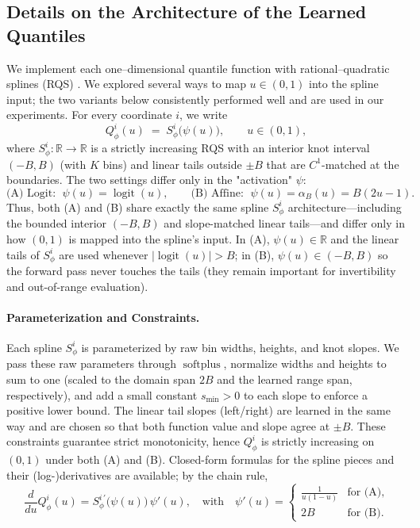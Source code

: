 \documentclass{article}
\theoremstyle{plain}
\theoremstyle{definition}
\theoremstyle{remark}
\begin{document}
\subsection{Details on the Architecture of the Learned Quantiles}\label{appendix:learned-quantile}
{We implement each one–dimensional quantile function with rational–quadratic splines (RQS) \cite{GD1982,durkan2019neural}. We explored several ways to map \(u\in(0,1)\) into the spline input; the two variants below consistently performed well and are used in our experiments. For every coordinate \(i\), we write
\[
Q^i_\phi(u) \;=\; S^i_\phi\!\bigl(\psi(u)\bigr), \qquad u\in(0,1),
\]
where \(S^i_\phi:\mathbb{R}\!\to\!\mathbb{R}\) is a strictly increasing RQS with an interior knot interval \((-B,B)\) (with \(K\) bins) and linear tails outside \(\pm B\) that are \(C^1\)-matched at the boundaries. The two settings differ only in the "activation" \(\psi\):
\[
\text{(A) Logit: }\;\psi(u)=\operatorname{logit}(u), 
\qquad 
\text{(B) Affine: }\;\psi(u)=\alpha_B(u)=B(2u-1).
\]
Thus, both (A) and (B) share exactly the same spline \(S^i_\phi\) architecture—including the bounded interior \((-B,B)\) and slope-matched linear tails—and differ only in how \((0,1)\) is mapped into the spline's input. In (A), \(\psi(u)\in\mathbb{R}\) and the linear tails of \(S^i_\phi\) are used whenever \(|\operatorname{logit}(u)|>B\); in (B), \(\psi(u)\in(-B,B)\) so the forward pass never touches the tails (they remain important for invertibility and out-of-range evaluation).

\paragraph{Parameterization and Constraints.}
Each spline \(S^i_\phi\) is parameterized by raw bin widths, heights, and knot slopes. We pass these raw parameters through \(\operatorname{softplus}\), normalize widths and heights to sum to one (scaled to the domain span \(2B\) and the learned range span, respectively), and add a small constant \(s_{\min}>0\) to each slope to enforce a positive lower bound. The linear tail slopes (left/right) are learned in the same way and are chosen so that both function value and slope agree at \(\pm B\). These constraints guarantee strict monotonicity, hence \(Q^i_\phi\) is strictly increasing on \((0,1)\) under both (A) and (B). Closed-form formulas for the spline pieces and their (log-)derivatives are available; by the chain rule,
\[
\frac{d}{du}Q^i_\phi(u)=S^{i\,\prime}_\phi\!\bigl(\psi(u)\bigr)\,\psi'(u),
\quad\text{with}\quad
\psi'(u)=\begin{cases}
\frac{1}{u(1-u)} & \text{for (A)},\\[4pt]
2B & \text{for (B)}.
\end{cases}
\]

}
\end{document}

